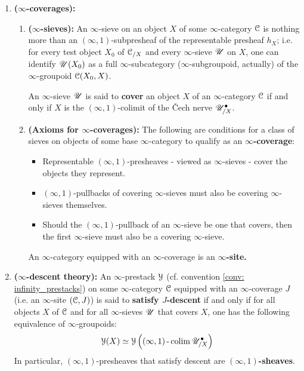                 \begin{definition} \label{def: infinity_sites}
                    \noindent
                    \begin{enumerate}
                        \item \textbf{($\infty$-coverages):} 
                            \begin{enumerate}
                                \item \textbf{($\infty$-sieves):} An $\infty$-sieve on an object $X$ of some $\infty$-category $\mathcal{C}$ is nothing more than an $(\infty, 1)$-subpresheaf of the representable presheaf $h_X$; i.e. for every test object $X_0$ of $\mathcal{C}_{/X}$ and every $\infty$-sieve $\mathscr{U}$ on $X$, one can identify $\mathscr{U}(X_0)$ as a full $\infty$-subcategory ($\infty$-subgroupoid, actually) of the $\infty$-groupoid $\mathcal{C}(X_0, X)$.
                                
                                An $\infty$-sieve $\mathscr{U}$ is said to \textbf{cover} an object $X$ of an $\infty$-category $\mathcal{C}$ if and only if $X$ is the $(\infty, 1)$-colimit of the \v{C}ech nerve $\mathscr{U}^{\bullet}_{/X}$. 
                                \item \textbf{(Axioms for $\infty$-coverages):} The following are conditions for a class of sieves on objects of some base $\infty$-category to qualify as an \textbf{$\infty$-coverage}:
                                    \begin{itemize}
                                        \item Representable $(\infty, 1)$-presheaves - viewed as $\infty$-sieves - cover the objects they represent.
                                        \item $(\infty, 1)$-pullbacks of covering $\infty$-sieves must also be covering $\infty$-sieves themselves. 
                                        \item Should the $(\infty, 1)$-pullback of an $\infty$-sieve be one that covers, then the first $\infty$-sieve must also be a covering $\infty$-sieve.
                                    \end{itemize}
                                An $\infty$-category equipped with an $\infty$-coverage is an \textbf{$\infty$-site.}
                            \end{enumerate}
                        \item \textbf{($\infty$-descent theory):} An $\infty$-prestack $\mathcal{Y}$ (cf. convention \ref{conv: infinity_prestacks}) on some $\infty$-category $\mathcal{C}$ equipped with an $\infty$-coverage $J$ (i.e. an $\infty$-site $(\mathcal{C}, J)$) is said to \textbf{satisfy $J$-descent} if and only if for all objects $X$ of $\mathcal{C}$ and for all $\infty$-sieves $\mathscr{U}$ that covers $X$, one has the following equivalence of $\infty$-groupoids:
                            $$\mathcal{Y}(X) \simeq \mathcal{Y}\left((\infty, 1)\operatorname{-}\operatorname{colim} \mathscr{U}^{\bullet}_{/X}\right)$$
                        In particular, $(\infty, 1)$-presheaves that satisfy descent are \textbf{$(\infty, 1)$-sheaves}.
                    \end{enumerate}
                \end{definition}
                
